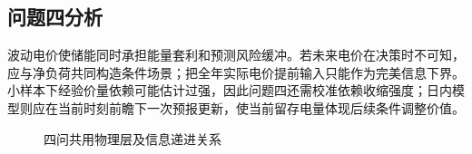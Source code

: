 \subsection{问题四分析}

波动电价使储能同时承担能量套利和预测风险缓冲。若未来电价在决策时不可知，应与净负荷共同构造条件场景；把全年实际电价提前输入只能作为完美信息下界。小样本下经验价量依赖可能估计过强，因此问题四还需校准依赖收缩强度；日内模型则应在当前时刻前瞻下一次预报更新，使当前留存电量体现后续条件调整价值。

\begin{figure}[H]
  \centering
  
  \caption{四问共用物理层及信息递进关系}
  \label{fig:framework}
\end{figure}
